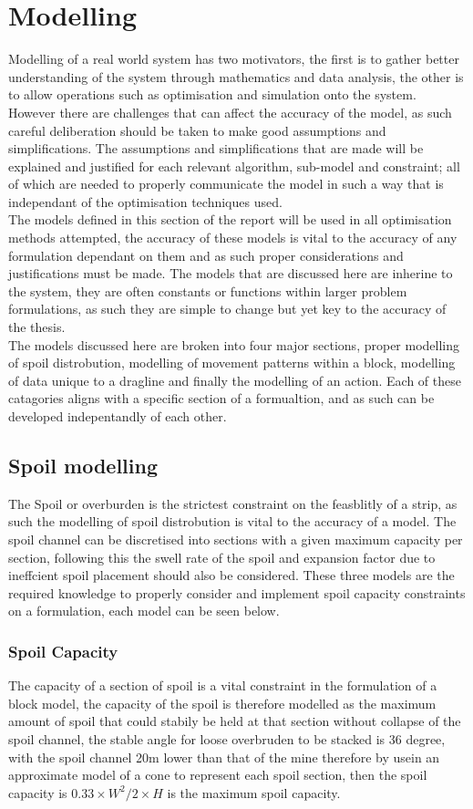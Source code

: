 
\section{Modelling}
Modelling of a real world system has two motivators, the first is to gather better understanding of the system through mathematics and data analysis, the other is to allow operations such as optimisation and simulation onto the system. However there are challenges that can affect the accuracy of the model, as such careful deliberation should be taken to make good assumptions and simplifications. The assumptions and simplifications that are made will be explained and justified for each relevant algorithm, sub-model and constraint; all of which are needed to properly communicate the model in such a way that is independant of the optimisation techniques used.  
\\
The models defined in this section of the report will be used in all optimisation methods attempted, the accuracy of these models is vital to the accuracy of any formulation dependant on them and as such proper considerations and justifications must be made. The models that are discussed here are inherine to the system, they are often constants or functions within larger problem formulations, as such they are simple to change but yet key to the accuracy of the thesis. \\
The models discussed here are broken into four major sections, proper modelling of spoil distrobution, modelling of movement patterns within a block, modelling of data unique to a dragline and finally the modelling of an action. Each of these catagories aligns with a specific section of a formualtion, and as such can be developed indepentandly of each other. 
\subsection{Spoil modelling}
The Spoil or overburden is the strictest constraint on the feasblitly of a strip, as such the modelling of spoil distrobution is vital to the accuracy of a model. The spoil channel can be discretised into sections with a given maximum capacity per section, following this the swell rate of the spoil and expansion factor due to ineffcient spoil placement should also be considered. These three models are the required knowledge to properly consider and implement spoil capacity constraints on a formulation, each model can be seen below. 
\subsubsection{Spoil Capacity}
The capacity of a section of spoil is a vital constraint in the formulation of a block model, the capacity of the spoil is therefore modelled as the maximum amount of spoil that could stabily be held at that section without collapse of the spoil channel, the stable angle for loose overbruden to be stacked is 36 degree, with the spoil channel 20m lower than that of the mine therefore by usein an approximate model of a cone to represent each spoil section, then the spoil capacity is $0.33\times W^2/2 \times H $ is the maximum spoil capacity. 
